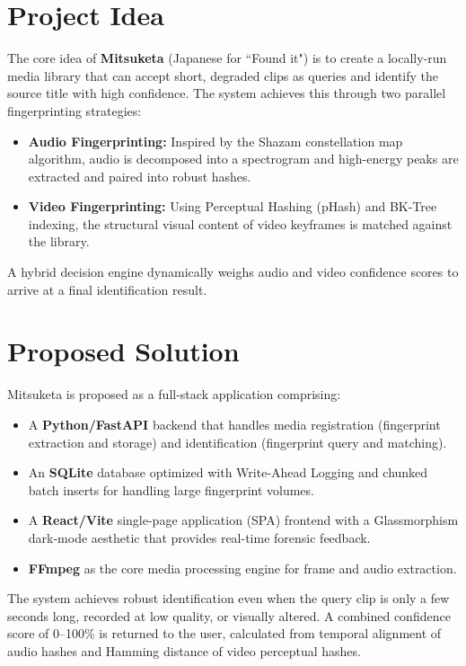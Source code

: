 \section{Project Idea}
The core idea of \textbf{Mitsuketa} (Japanese for ``Found it") is to create a locally-run media library that can accept short, degraded clips as queries and identify the source title with high confidence. The system achieves this through two parallel fingerprinting strategies:

\begin{itemize}
  \item \textbf{Audio Fingerprinting:} Inspired by the Shazam constellation map algorithm, audio is decomposed into a spectrogram and high-energy peaks are extracted and paired into robust hashes.
  \item \textbf{Video Fingerprinting:} Using Perceptual Hashing (pHash) and BK-Tree indexing, the structural visual content of video keyframes is matched against the library.
\end{itemize}

A hybrid decision engine dynamically weighs audio and video confidence scores to arrive at a final identification result.

\section{Proposed Solution}
Mitsuketa is proposed as a full-stack application comprising:
\begin{itemize}
  \item A \textbf{Python/FastAPI} backend that handles media registration (fingerprint extraction and storage) and identification (fingerprint query and matching).
  \item An \textbf{SQLite} database optimized with Write-Ahead Logging and chunked batch inserts for handling large fingerprint volumes.
  \item A \textbf{React/Vite} single-page application (SPA) frontend with a Glassmorphism dark-mode aesthetic that provides real-time forensic feedback.
  \item \textbf{FFmpeg} as the core media processing engine for frame and audio extraction.
\end{itemize}

The system achieves robust identification even when the query clip is only a few seconds long, recorded at low quality, or visually altered. A combined confidence score of 0--100\% is returned to the user, calculated from temporal alignment of audio hashes and Hamming distance of video perceptual hashes.

